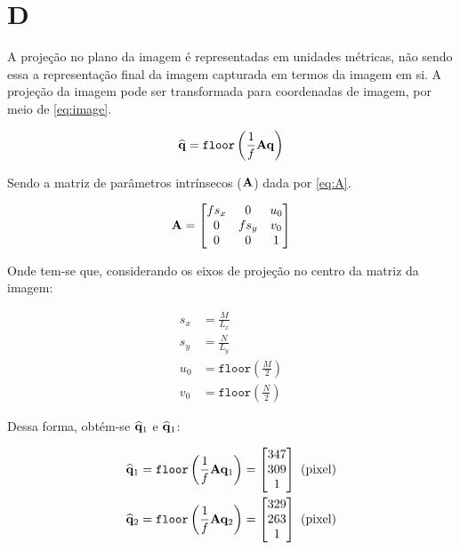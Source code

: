 \section{D}

A projeção no plano da imagem é representadas em unidades métricas, não sendo essa a representação final da imagem capturada em termos da imagem em si. A projeção da imagem pode ser transformada para coordenadas de imagem, por meio de \eqref{eq:image}.

\begin{equation}\label{eq:image}
	\widehat{\mathbf{q}} = \texttt{floor}\left(\frac{1}{f}\mathbf{A}\mathbf{q}\right)
\end{equation}

Sendo a matriz de parâmetros intrínsecos ($\mathbf{A}$) dada por \eqref{eq:A}.

\begin{equation}\label{eq:A}
	\mathbf{A} = \begin{bmatrix}
		fs_x & 0 & u_0 \\
		0 & fs_y & v_0\\
		0 & 0 & 1
	\end{bmatrix}
\end{equation}

Onde tem-se que, considerando os eixos de projeção no centro da matriz da imagem:

\begin{align}
	s_x &= \frac{M}{L_x} \\
	s_y &= \frac{N}{L_y} \\
	u_0 &= \texttt{floor}\left(\frac{M}{2}\right)  \\
	v_0 &= \texttt{floor}\left(\frac{N}{2}\right)  
\end{align}

Dessa forma, obtém-se $\widehat{\mathbf{q}}_1$ e $\widehat{\mathbf{q}}_1$:

\begin{align}
	\widehat{\mathbf{q}}_1 &= \texttt{floor}\left(\frac{1}{f}\mathbf{A}\mathbf{q}_1\right) = \begin{bmatrix}
		347\\
		309\\
		1
	\end{bmatrix}  \text{ (pixel)}\\
	\widehat{\mathbf{q}}_2 &= \texttt{floor}\left(\frac{1}{f}\mathbf{A}\mathbf{q}_2\right)  = \begin{bmatrix}
		329\\
		263\\
		1
	\end{bmatrix}  \text{ (pixel)}
\end{align}

